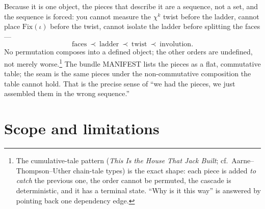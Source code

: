 \documentclass[11pt]{article}
\theoremstyle{definition}
\theoremstyle{plain}
\begin{document}
Because it is one object, the pieces that describe it are a sequence, not a set, and the sequence
is forced: you cannot measure the $\chi^k$ twist before the ladder, cannot place
$\mathrm{Fix}(\iota)$ before the twist, cannot isolate the ladder before splitting the faces ---
\[
  \text{faces}\ \prec\ \text{ladder}\ \prec\ \text{twist}\ \prec\ \text{involution}.
\]
No permutation composes into a defined object; the other orders are undefined, not merely
worse.\footnote{The cumulative-tale pattern (\emph{This Is the House That Jack Built}; cf.\
Aarne--Thompson--Uther chain-tale types) is the exact shape: each piece is added \emph{to
catch} the previous one, the order cannot be permuted, the cascade is deterministic, and it has a
terminal state. ``Why is it this way'' is answered by pointing back one dependency edge.} The
bundle MANIFEST lists the pieces as a flat, commutative table; the seam is the same pieces under
the non-commutative composition the table cannot hold. That is the precise sense of ``we had the
pieces, we just assembled them in the wrong sequence.''

\section{Scope and limitations}\label{sec:scope}
\end{document}
